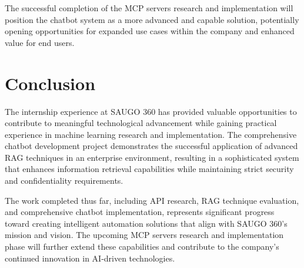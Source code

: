 \documentclass[12pt,a4paper]{article}
\begin{document}
The successful completion of the MCP servers research and implementation will position the chatbot system as a more advanced and capable solution, potentially opening opportunities for expanded use cases within the company and enhanced value for end users.

\section{Conclusion}

The internship experience at SAUGO 360 has provided valuable opportunities to contribute to meaningful technological advancement while gaining practical experience in machine learning research and implementation. The comprehensive chatbot development project demonstrates the successful application of advanced RAG techniques in an enterprise environment, resulting in a sophisticated system that enhances information retrieval capabilities while maintaining strict security and confidentiality requirements.

The work completed thus far, including API research, RAG technique evaluation, and comprehensive chatbot implementation, represents significant progress toward creating intelligent automation solutions that align with SAUGO 360's mission and vision. The upcoming MCP servers research and implementation phase will further extend these capabilities and contribute to the company's continued innovation in AI-driven technologies.
\end{document}
